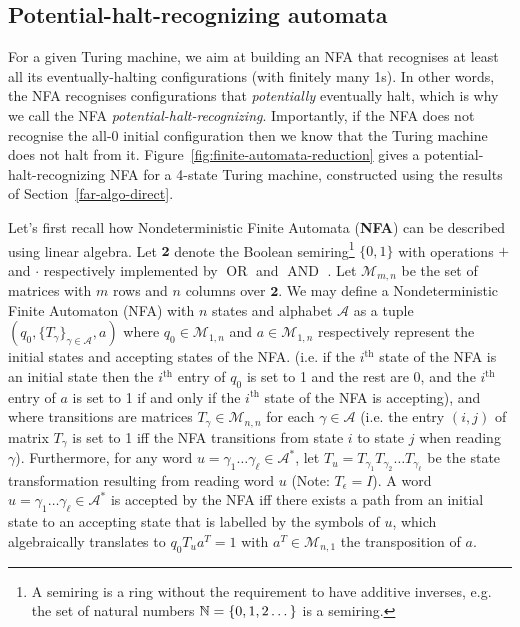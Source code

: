 \subsection{Potential-halt-recognizing automata}
\newcommand{\M}{\mathcal{M}}
\newcommand{\T}{^T}
\newcommand{\row}{\text{row}}
\label{far-defs-recognizer}
For a given Turing machine, we aim at building an NFA that recognises at least all its eventually-halting configurations (with finitely many 1s). In other words, the NFA recognises configurations that \textit{potentially} eventually halt, which is why we call the NFA \textit{potential-halt-recognizing}. Importantly, if the NFA does not recognise the all-0 initial configuration then we know that the Turing machine does not halt from it. Figure~\ref{fig:finite-automata-reduction} gives a potential-halt-recognizing NFA for a 4-state Turing machine, constructed using the results of Section~\ref{far-algo-direct}.


Let's first recall how Nondeterministic Finite Automata (\textbf{NFA}) can be described using linear algebra. Let $\mathbf{2}$ denote the Boolean semiring\footnote{A semiring is a ring without the requirement to have additive inverses, e.g. the set of natural numbers $\mathbb{N}=\{0,1,2\dots\}$ is a semiring.} $\{0,1\}$ with operations $+$ and $\cdot$ respectively implemented by $\operatorname{OR}$ and $\operatorname{AND}$ \cite{CUNINGHAMEGREEN1991251}.
Let $\M_{m,n}$ be the set of matrices with $m$ rows and $n$ columns over $\mathbf{2}$. We may define a Nondeterministic Finite Automaton (NFA) with $n$ states and alphabet $\mathcal{A}$ as a tuple $(q_0, \{T_\gamma\}_{\gamma \in \mathcal{A}}, a)$ where $q_0 \in \M_{1,n}$ and $a \in \M_{1,n}$ respectively represent the initial states and accepting states of the NFA. (i.e. if the $i^\text{th}$ state of the NFA is an initial state then the $i^\text{th}$ entry of $q_0$ is set to 1 and the rest are 0, and the $i^\text{th}$ entry of $a$ is set to 1 if and only if the $i^\text{th}$ state of the NFA is accepting), and where transitions are matrices $T_\gamma\in \M_{n,n}$ for each $\gamma\in\mathcal{A}$ (i.e. the entry $(i,j)$ of matrix $T_\gamma$ is set to 1 iff the NFA transitions from state $i$ to state $j$ when reading $\gamma$). Furthermore, for any word $u=\gamma_1\dots\gamma_\ell \in \mathcal{A}^*$, let $T_u = T_{\gamma_1} T_{\gamma_2} \dots T_{\gamma_\ell}$ be the state transformation resulting from reading word $u$ (Note: $T_\epsilon = I$). A word $u=\gamma_1\dots\gamma_\ell \in \mathcal{A}^*$ is accepted by the NFA iff there exists a path from an initial state to an accepting state that is labelled by the symbols of $u$, which algebraically translates to $q_0 T_u a\T = 1$ with $a\T \in \M_{n,1}$ the transposition of $a$.



